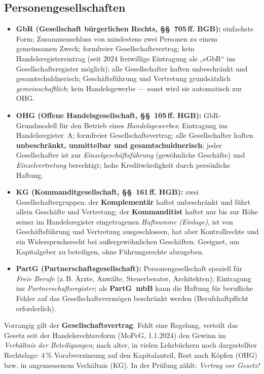 \documentclass[11pt, a4paper]{article}
\begin{document}
\subsection{Personengesellschaften}

\begin{itemize}
  \item \textbf{GbR (Gesellschaft bürgerlichen Rechts, §§~705\,ff. BGB):} einfachste Form;
    Zusammenschluss von mindestens zwei Personen zu einem gemeinsamen Zweck; formfreier
    Gesellschaftsvertrag; kein Handelsregistereintrag (seit 2024 freiwillige Eintragung
    als „eGbR`` ins Gesellschaftsregister möglich); alle Gesellschafter haften
    unbeschränkt und gesamtschuldnerisch; Geschäftsführung und Vertretung grundsätzlich
    \emph{gemeinschaftlich}; kein Handelsgewerbe --- sonst wird sie automatisch zur OHG.
  \item \textbf{OHG (Offene Handelsgesellschaft, §§~105\,ff. HGB):} GbR-Grundmodell für
    den Betrieb eines \emph{Handelsgewerbes}; Eintragung ins Handelsregister~A;
    formfreier Gesellschaftsvertrag; alle Gesellschafter haften \textbf{unbeschränkt,
    unmittelbar und gesamtschuldnerisch}; jeder Gesellschafter ist zur
    \emph{Einzelgeschäftsführung} (gewöhnliche Geschäfte) und \emph{Einzelvertretung}
    berechtigt; hohe Kreditwürdigkeit durch persönliche Haftung.
  \item \textbf{KG (Kommanditgesellschaft, §§~161\,ff. HGB):} zwei Gesellschaftergruppen:
    der \textbf{Komplementär} haftet unbeschränkt und führt allein Geschäfte und
    Vertretung; der \textbf{Kommanditist} haftet nur bis zur Höhe seiner im
    Handelsregister eingetragenen \emph{Haftsumme (Einlage)}, ist von Geschäftsführung
    und Vertretung ausgeschlossen, hat aber Kontrollrechte und ein Widerspruchsrecht bei
    außergewöhnlichen Geschäften. Geeignet, um Kapitalgeber zu beteiligen, ohne
    Führungsrechte abzugeben.
  \item \textbf{PartG (Partnerschaftsgesellschaft):} Personengesellschaft speziell für
    \emph{Freie Berufe} (z.\,B. Ärzte, Anwälte, Steuerberater, Architekten); Eintragung
    ins \emph{Partnerschaftsregister}; als \textbf{PartG~mbB} kann die Haftung für
    berufliche Fehler auf das Gesellschaftsvermögen beschränkt werden
    (Berufshaftpflicht erforderlich).
\end{itemize}

\begin{merksatz}[title={\bfseries Gewinnverteilung bei OHG und KG}]
Vorrangig gilt der \textbf{Gesellschaftsvertrag}. Fehlt eine Regelung, verteilt das
Gesetz seit der Handelsrechtsreform (MoPeG, 1.1.2024) den Gewinn im \emph{Verhältnis der
Beteiligungen}; nach alter, in vielen Lehrbüchern noch dargestellter Rechtslage: 4\,\%
Vorabverzinsung auf den Kapitalanteil, Rest nach Köpfen (OHG) bzw. in angemessenem
Verhältnis (KG). In der Prüfung zählt: \emph{Vertrag vor Gesetz!}
\end{merksatz}
\end{document}
